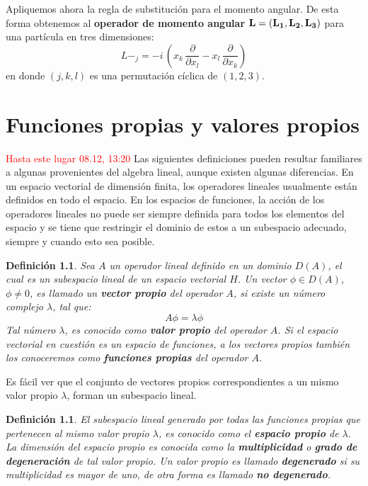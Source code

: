 \documentclass[12pt]{book}
\numberwithin{equation}{chapter}
\newtheorem{definition}[theorem]{Definici\'on}
\begin{document}
Apliquemos ahora la regla de substituci\'on para el momento angular. De esta forma obtenemos al {\bf operador de momento angular} $\bf{L}= (L_{1},L_{2},L_{3})$ para una part\'icula en tres dimensiones:
\begin{equation}
L-_{j}= -i \, \left( x_{k}\, \frac{\partial}{\partial x_{l}} - x_{l}\, \frac{\partial}{\partial x_{k}} \right)
\end{equation}
en donde $(j,k,l)$ es una permutaci\'on c\'iclica de $(1,2,3)$. 

\newpage


\chapter{Funciones propias y valores propios}
\textcolor{red}{Hasta este lugar 08.12, 13:20}
Las siguientes definiciones pueden resultar familiares a algunas provenientes del algebra lineal, aunque existen algunas diferencias. En un espacio vectorial de dimensi\'on finita, los operadores lineales usualmente est\'an definidos en todo el espacio. En los espacios de funciones, la acci\'on de los operadores lineales no puede ser siempre definida para todos  los elementos del espacio y se tiene que restringir el dominio de estos a un subespacio adecuado, siempre y cuando esto sea posible.
\begin{definition}
Sea $A$ un operador lineal definido en un dominio $D(A)$, el cual es un subespacio lineal de un espacio vectorial $H$. Un vector $\phi \in D(A)$, $\phi \neq 0$, es llamado un {\bf vector propio} del operador $A$, si existe un n\'umero complejo $\lambda$, tal que:
\begin{equation}
A\phi = \lambda \phi
\end{equation}
Tal n\'umero $\lambda$, es conocido como {\bf valor propio} del operador $A$. Si el espacio vectorial en cuesti\'on es un espacio de funciones, a los vectores propios tambi\'en los conoceremos como {\bf funciones propias} del operador $A$.
\end{definition}

Es f\'acil ver que el conjunto de vectores propios correspondientes a un mismo valor propio $\lambda$, forman un subespacio lineal.

\begin{definition}
El subespacio lineal generado por todas las funciones propias que pertenecen al mismo valor propio $\lambda$, es conocido como el {\bf  espacio propio} de $\lambda$. La dimensi\'on del espacio propio es conocida como la {\bf multiplicidad} o {\bf grado de degeneraci\'on} de tal valor propio. Un valor propio es llamado {\bf degenerado} si su multiplicidad es mayor de uno, de otra forma es llamado {\bf no degenerado}.
\end{definition} 
\end{document}
